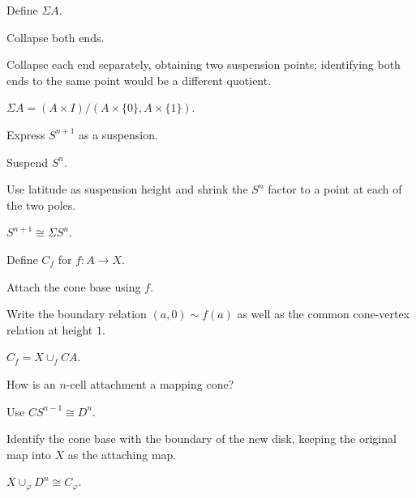\begin{exercise}\label{exr:viii07-03}
Define \(\Sigma A\).
\end{exercise}
\begin{hint}
Collapse both ends.

Collapse each end separately, obtaining two suspension points; identifying both ends to the same point would be a different quotient.
\end{hint}
\begin{solution}
\(\Sigma A=(A\times I)/(A\times\{0\},A\times\{1\})\).
\end{solution}

\begin{exercise}\label{exr:viii07-04}
Express \(S^{n+1}\) as a suspension.
\end{exercise}
\begin{hint}
Suspend \(S^n\).

Use latitude as suspension height and shrink the \(S^n\) factor to a point at each of the two poles.
\end{hint}
\begin{solution}
\(S^{n+1}\cong\Sigma S^n\).
\end{solution}

\begin{exercise}\label{exr:viii07-05}
Define \(C_f\) for \(f:A\to X\).
\end{exercise}
\begin{hint}
Attach the cone base using \(f\).

Write the boundary relation \((a,0)\sim f(a)\) as well as the common cone-vertex relation at height \(1\).
\end{hint}
\begin{solution}
\(C_f=X\cup_f CA\).
\end{solution}

\begin{exercise}\label{exr:viii07-06}
How is an \(n\)-cell attachment a mapping cone?
\end{exercise}
\begin{hint}
Use \(CS^{n-1}\cong D^n\).

Identify the cone base with the boundary of the new disk, keeping the original map into \(X\) as the attaching map.
\end{hint}
\begin{solution}
\(X\cup_\varphi D^n\cong C_\varphi\).
\end{solution}


